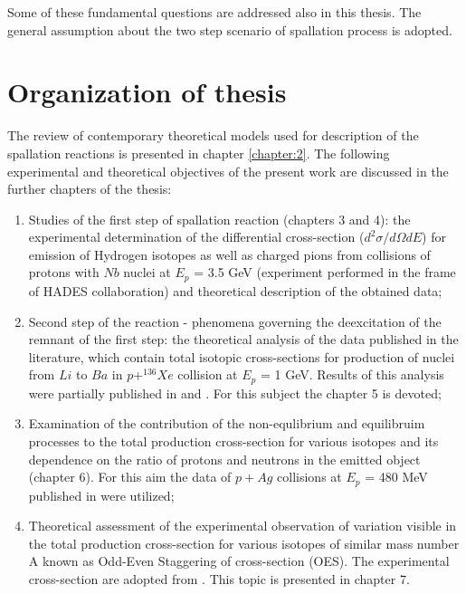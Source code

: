 Some of these fundamental questions are addressed also in this thesis. The general assumption about the two step scenario of spallation process is adopted. 

\section{Organization of thesis}
The review of contemporary theoretical models used for description of the spallation reactions is presented in chapter \ref{chapter:2}. 
The following experimental and theoretical objectives of the present work are discussed in the further chapters of the thesis:

\begin{enumerate}[label=\roman*)]
	\item Studies of the first step of spallation reaction (chapters 3 and 4): 
	the experimental determination of the differential cross-section 
	($d^2\sigma/d\Omega dE$) 
	for emission of Hydrogen isotopes 
	as well as charged pions
	from collisions of protons 
	with $Nb$ nuclei at $E_p$ = 3.5 GeV (experiment performed in the frame of HADES collaboration) and theoretical description of the obtained data;
    \item Second step of the reaction - phenomena governing the deexcitation of the remnant of the first step: 
    the theoretical analysis of the data published in the literature, which contain total isotopic cross-sections for production of nuclei from $Li$ to $Ba$ in $p$+$^{136}Xe$ collision at $E_p$ = 1 GeV. 
    Results of this
	analysis were partially published in  \cite{singh2018predictive} and \cite{singh2019odd}. 
	For this subject the chapter 5 is devoted;
	\item Examination of the contribution of the non-equlibrium and equilibruim processes to the total production cross-section for various isotopes and its dependence on the ratio of protons and neutrons in the emitted object (chapter 6). For this aim the data of $p+Ag$ collisions at $E_p$ = 480 MeV published in \cite{Green1984} were utilized;
	\item Theoretical assessment of the experimental observation of variation  
	visible in the total production cross-section for various isotopes of similar mass number A known as Odd-Even Staggering of cross-section (OES). The experimental cross-section are adopted from \cite{Green1984}. This topic is presented in chapter 7.
\end{enumerate}



